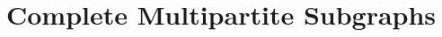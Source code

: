 \documentclass[a4paper,11pt]{article}
\theoremstyle{plain}
\newtheorem{lem}[thm]{Lemma}
\theoremstyle{definition}
\renewcommand{\leq}{\leqslant}
\renewcommand{\geq}{\geqslant}
\begin{document}
%
%
%
%
%
%
%
%
%
%
%
%
%
%
%	

\section{Complete Multipartite Subgraphs}

\fontsize{10}{11} 
\selectfont 

\let\oldthebibliography=\thebibliography
\let\endoldthebibliography=\endthebibliography
\renewenvironment{thebibliography}[1]{%
\begin{oldthebibliography}{#1}%
\setlength{\parskip}{0.3ex}%
\setlength{\itemsep}{0.3ex}%
}{\end{oldthebibliography}}

%




\end{document}

